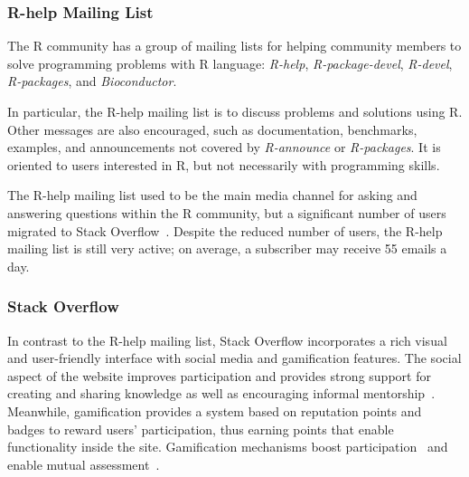 \subsubsection{R-help Mailing List}
    The R community has a group of mailing lists for helping community members to solve programming problems with R language: \emph{R-help}, \emph{R-package-devel}, \emph{R-devel}, \emph{R-packages}, and \emph{Bioconductor}.

In particular, the R-help mailing list is to discuss problems and solutions using R. 
Other messages are also encouraged, such as documentation, benchmarks, examples, and announcements not covered by \emph{R-announce} or \emph{R-packages}.
It is oriented to users interested in R, but not necessarily with programming skills.

    The R-help mailing list used to be the main media channel for asking and answering questions within the R community, but a significant number of users migrated to Stack Overflow~\cite{Vasilescu2014c}.
    Despite the reduced number of users, the R-help mailing list is still very active; on average, a subscriber may receive 55 emails a day.

\subsubsection{Stack Overflow}
\label{subsec:Rtag}

    In contrast to the R-help mailing list, Stack Overflow incorporates a rich visual and user-friendly interface with social media and gamification features.
    The social aspect of the website improves participation and provides strong support for creating and sharing knowledge as well as encouraging informal mentorship~\cite{Jenkins2009, Storey2014}.
    Meanwhile, gamification provides a system based on reputation points and badges to reward users' participation, thus earning points that enable functionality inside the site.
    Gamification mechanisms boost participation~\cite{Vasilescu2014} and enable mutual assessment~\cite{Singer2013}.

